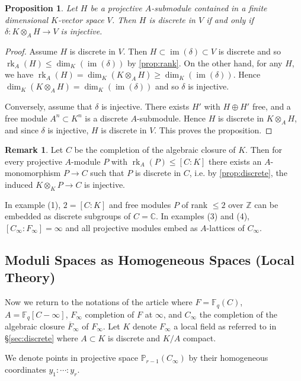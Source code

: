\documentclass[12pt,a4paper]{article}
\theoremstyle{plain}
\newtheorem{proposition}{Proposition}[section]
\theoremstyle{definition}
\newtheorem{remark}{Remark}[section]
\theoremstyle{remark}
\DeclareMathOperator{\im}{im}
\newcommand{\bF}{\mathbb{F}}
\newcommand{\bC}{\mathbb{C}}
\newcommand{\bZ}{\mathbb{Z}}
\newcommand{\bP}{\mathbb{P}}
\providecommand{\rk}{\operatorname{rk}}
\begin{document}
\begin{proposition}
\label{prop:discrete}
Let $H$ be a projective $A$-submodule contained in a finite dimensional $K$-vector space $V$. Then $H$ is discrete in $V$ if and only if $\delta: K \otimes_A H \to V$ is injective.
\end{proposition}

\begin{proof}
Assume $H$ is discrete in $V$. Then $H \subset \im(\delta) \subset V$ is discrete and so $\rk_A(H) \leq \dim_K(\im(\delta))$ by \eqref{prop:rank}. On the other hand, for any $H$, we have $\rk_A(H) = \dim_K(K \otimes_A H) \geq \dim_K(\im(\delta))$. Hence $\dim_K(K \otimes_A H) = \dim_K(\im(\delta))$ and so $\delta$ is injective.

Conversely, assume that $\delta$ is injective. There exists $H'$ with $H \oplus H'$ free, and a free module $A^n \subset K^n$ is a discrete $A$-submodule. Hence $H$ is discrete in $K \otimes_A H$, and since $\delta$ is injective, $H$ is discrete in $V$. This proves the proposition.
\end{proof}

\begin{remark}
\label{rem:embedding}
Let $C$ be the completion of the algebraic closure of $K$. Then for every projective $A$-module $P$ with $\rk_A(P) \leq [C : K]$ there exists an $A$-monomorphism $P \to C$ such that $P$ is discrete in $C$, i.e. by \eqref{prop:discrete}, the induced $K \otimes_K P \to C$ is injective.

In example (1), $2 = [C : K]$ and free modules $P$ of rank $\leq 2$ over $\bZ$ can be embedded as discrete subgroups of $C = \bC$. In examples (3) and (4), $[C_\infty : F_\infty] = \infty$ and all projective modules embed as $A$-lattices of $C_\infty$.
\end{remark}

\subsection{Moduli Spaces as Homogeneous Spaces (Local Theory)}
\label{sec:local}

Now we return to the notations of the article where $F = \bF_q(C)$, $A = \bF_q[C - \infty]$, $F_\infty$ completion of $F$ at $\infty$, and $C_\infty$ the completion of the algebraic closure $\overline{F}_\infty$ of $F_\infty$. Let $K$ denote $F_\infty$ a local field as referred to in \S\ref{sec:discrete} where $A \subset K$ is discrete and $K/A$ compact.

We denote points in projective space $\bP_{r-1}(C_\infty)$ by their homogeneous coordinates $y_1 : \cdots : y_r$.
\end{document}
